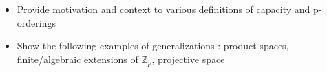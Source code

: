 \begin{itemize}
\item Provide motivation and context to various definitions of capacity and p-orderings
\item Show the following examples of generalizations : product spaces, finite/algebraic extensions of $\mathbb{Z}_p $, projective space
\end{itemize}